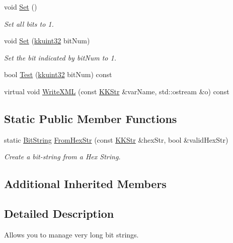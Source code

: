 \begin{DoxyCompactItemize}
void \hyperlink{class_k_k_b_1_1_bit_string_a408197f10d8ef4b235896c9bf4f9ff2a}{Set} ()
\begin{DoxyCompactList}\small\item\em Set all bits to \textquotesingle{}1\textquotesingle{}. \end{DoxyCompactList}\item 
void \hyperlink{class_k_k_b_1_1_bit_string_a1fd0485391733f37acfe04205cbb9f7b}{Set} (\hyperlink{namespace_k_k_b_af8d832f05c54994a1cce25bd5743e19a}{kkuint32} bit\+Num)
\begin{DoxyCompactList}\small\item\em Set the bit indicated by \textquotesingle{}bit\+Num\textquotesingle{} to \textquotesingle{}1\textquotesingle{}. \end{DoxyCompactList}\item 
bool \hyperlink{class_k_k_b_1_1_bit_string_a22ca08eb89f3ddcceade7490485cc5e8}{Test} (\hyperlink{namespace_k_k_b_af8d832f05c54994a1cce25bd5743e19a}{kkuint32} bit\+Num) const 
\item 
virtual void \hyperlink{class_k_k_b_1_1_bit_string_a4c0c3f7bf53ef6ca2558927f2cb500fc}{Write\+X\+ML} (const \hyperlink{class_k_k_b_1_1_k_k_str}{K\+K\+Str} \&var\+Name, std\+::ostream \&o) const 
\end{DoxyCompactItemize}
\subsection*{Static Public Member Functions}
\begin{DoxyCompactItemize}
\item 
static \hyperlink{class_k_k_b_1_1_bit_string}{Bit\+String} \hyperlink{class_k_k_b_1_1_bit_string_aef2308cabde1b30fc5efd50040fa4e40}{From\+Hex\+Str} (const \hyperlink{class_k_k_b_1_1_k_k_str}{K\+K\+Str} \&hex\+Str, bool \&valid\+Hex\+Str)
\begin{DoxyCompactList}\small\item\em Create a bit-\/string from a Hex String. \end{DoxyCompactList}\end{DoxyCompactItemize}
\subsection*{Additional Inherited Members}


\subsection{Detailed Description}
Allows you to manage very long bit strings. 


